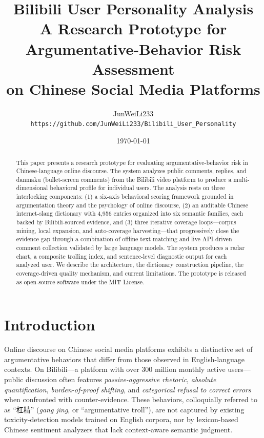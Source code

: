 \documentclass[11pt,a4paper]{article}
\title{
  \textbf{Bilibili User Personality Analysis}\\[4pt]
  \large A Research Prototype for Argumentative-Behavior Risk Assessment\\
  on Chinese Social Media Platforms
}
\author{
  JunWeiLi233\\
  \texttt{https://github.com/JunWeiLi233/Bilibili\_User\_Personality}
}
\date{\today}
\begin{document}
\maketitle

\begin{abstract}
This paper presents a research prototype for evaluating argumentative-behavior risk in
Chinese-language online discourse. The system analyzes public comments, replies, and
danmaku (bullet-screen comments) from the Bilibili video platform to produce a
multi-dimensional behavioral profile for individual users. The analysis rests on three
interlocking components: (1) a six-axis behavioral scoring framework grounded in
argumentation theory and the psychology of online discourse, (2) an auditable
Chinese internet-slang dictionary with 4,956 entries organized into six semantic
families, each backed by Bilibili-sourced evidence, and (3) three iterative coverage
loops---corpus mining, local expansion, and auto-coverage harvesting---that
progressively close the evidence gap through a combination of offline text matching and
live API-driven comment collection validated by large language models. The system
produces a radar chart, a composite trolling index, and sentence-level diagnostic output
for each analyzed user. We describe the architecture, the dictionary construction
pipeline, the coverage-driven quality mechanism, and current limitations. The prototype
is released as open-source software under the MIT License.
\end{abstract}

\section{Introduction}

Online discourse on Chinese social media platforms exhibits a distinctive set of
argumentative behaviors that differ from those observed in English-language contexts.
On Bilibili---a platform with over 300 million monthly active users---public discussion
often features \textit{passive-aggressive rhetoric}, \textit{absolute quantification},
\textit{burden-of-proof shifting}, and \textit{categorical refusal to correct errors}
when confronted with counter-evidence. These behaviors, colloquially referred to as
``杠精'' (\textit{gang jing}, or ``argumentative troll''), are not captured by
existing toxicity-detection models trained on English corpora, nor by lexicon-based
Chinese sentiment analyzers that lack context-aware semantic judgment.
\end{document}

